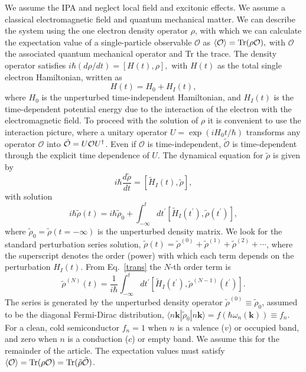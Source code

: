 \documentclass[floatfix,prb,aps,superscriptaddress,showpacs,11pt,preprint,letterpaper]{revtex4}
\begin{document}
We assume the IPA and neglect local field  
and excitonic effects.  
We assume a classical electromagnetic field
and quantum mechanical matter.
We can describe the system using 
the one electron density
operator ${\rho}$, with which we can calculate the expectation value of a
single-particle observable $\mathcal{O}$ as 
$\langle{\cal O}\rangle=\mbox{Tr}({\rho} {\cal O}),  
\label{calo}$
with $\mathcal{O}$ the associated quantum mechanical operator and Tr
the trace. 
The density operator satisfies
$
i\hbar (d{\rho}/dt)=[H(t),{\rho}],  
\label{rho}
$
with $H(t)$ as the total single electron Hamiltonian, written as 
\begin{equation*}
H(t)=H_{0}+H_{I}(t),  
\label{ache}
\end{equation*}
where $H_{0}$ is the unperturbed time-independent Hamiltonian, and $H_{I}(t)$
is the time-dependent potential energy due to the interaction of the
electron with the electromagnetic field.
To proceed with the solution of $\rho$  it is convenient to use the
interaction picture, where a unitary operator $U=\exp ({iH_{0}t/\hbar })$
transforms any operator $\mathcal{O}$ into 
$\tilde{\mathcal{O}}=U{\cal O}U^{\dagger }$. Even if $\mathcal{O}$ 
is time-independent, 
$\tilde{\mathcal{O}}$ is time-dependent through the explicit
time dependence of $U$. 
The dynamical 
equation for $\tilde{\rho}$ is 
given by
\begin{equation*}
i\hbar \frac{d\tilde{{\rho}}}{dt}=[\tilde{H}_{I}(t),\tilde{{\rho}}],  
\label{rho1}
\end{equation*}
with solution 
\begin{equation}
i\hbar \tilde{{\rho}}(t)=i\hbar \tilde{{\rho}}_{0}+\int_{-\infty }^{t}dt^{\prime }[
\tilde{H}_{I}(t^{\prime }),\tilde{\rho}(t^{\prime })],  
\label{trans}
\end{equation}
where $\tilde{\rho}_{0}=\tilde{\rho}(t=-\infty )$ is the unperturbed density matrix. We look
for the standard perturbation series solution, 
$\tilde{\rho}(t)=\tilde{\rho}^{(0)}+\tilde{\rho}^{(1)}+\tilde{\rho}^{(2)}+\cdots$,  
where the superscript denotes the order (power) with which each term depends
on the perturbation $H_{I}(t)$. From Eq.~\eqref{trans} the $N$-th order
term is 
\begin{equation}
\tilde{{\rho}}^{(N)}(t)=\frac{1}{i\hbar }\int_{-\infty }^{t}dt^{\prime }[\tilde{
H}_{I}(t^{\prime }),\tilde{\rho}^{(N-1)}(t^{\prime })].  
\label{rhop}
\end{equation}
The series is generated by the unperturbed density operator $\tilde{\rho}
^{(0)}\equiv \tilde{\rho}_{0}$, assumed to be the diagonal Fermi-Dirac distribution, 
$\langle n\mathbf{k}|\tilde{\rho}_{0}|n\mathbf{k}\rangle=f(\hbar \omega_{n}(\mathbf{k}))\equiv f_{n}$. For a
clean, cold semiconductor $f_{n}=1$ when $n$ is a valence ($v$) or
occupied band, and zero when $n$ is a conduction ($c$) or empty band.
We assume this for the remainder of the article.
The expectation values must satisfy
$
\langle{\cal O}\rangle=
\mbox{Tr}({\rho}{\cal O})
=
\mbox{Tr}(\tilde{{\rho}}\tilde{\cal O})
$.  
\end{document}
